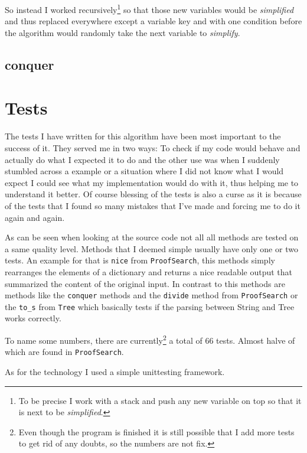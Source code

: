 So instead I worked recursively\footnote{To be precise I work with a stack and push any new variable on top so that it is next to be \emph{simplified}.} so that those new variables would be \emph{simplified} and thus replaced everywhere except a variable key and with one condition before the algorithm would randomly take the next variable to \emph{simplify}.


\subsection{conquer}


\section{Tests}
The tests I have written for this algorithm have been most important to the success of it. They served me in two ways: To check if my code would behave and actually do what I expected it to do and the other use was when I suddenly stumbled across a example or a situation where I did not know what I would expect I could see what my implementation would do with it, thus helping me to understand it better.
Of course blessing of the tests is also a curse as it is because of the tests that I found so many mistakes that I've made and forcing me to do it again and again.

As can be seen when looking at the source code not all all methods are tested on a same quality level. Methods that I deemed simple usually have only one or two tests. An example for that is \texttt{nice} from \texttt{ProofSearch}, this methods simply rearranges the elements of a dictionary and returns a nice readable output that summarized the content of the original input. In contrast to this methods are methods like the \texttt{conquer} methods and the \texttt{divide} method from \texttt{ProofSearch} or the \texttt{to\_s} from \texttt{Tree} which basically tests if the parsing between String and Tree works correctly.

To name some numbers, there are currently\footnote{Even though the program is finished it is still possible that I add more tests to get rid of any doubts, so the numbers are not fix.} a total of 66 tests. Almost halve of which are found in \texttt{ProofSearch}. 

As for the technology I used a simple unittesting framework.
